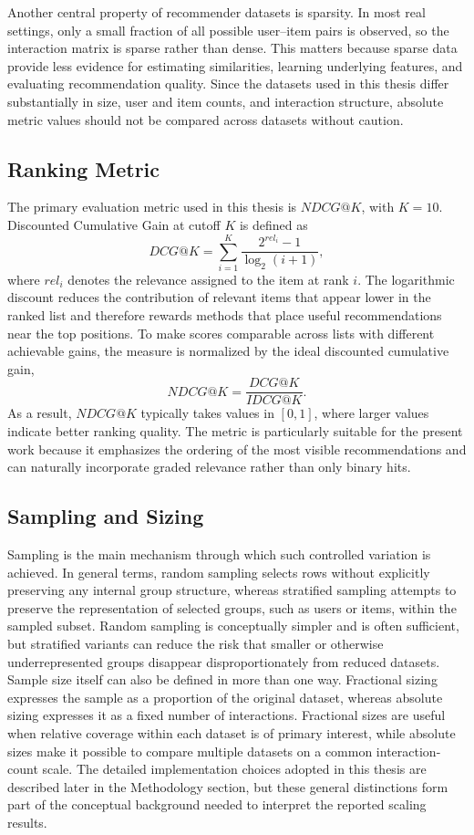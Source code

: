 \documentclass[12pt,a4paper]{article}
\begin{document}
Another central property of recommender datasets is sparsity. In most real settings, only a small fraction of all possible user--item pairs is observed, so the interaction matrix is sparse rather than dense. This matters because sparse data provide less evidence for estimating similarities, learning underlying features, and evaluating recommendation quality. Since the datasets used in this thesis differ substantially in size, user and item counts, and interaction structure, absolute metric values should not be compared across datasets without caution.

\subsection{Ranking Metric}

The primary evaluation metric used in this thesis is $NDCG@K$, with $K=10$. Discounted Cumulative Gain at cutoff $K$ is defined as
\[
DCG@K = \sum_{i=1}^{K} \frac{2^{rel_i}-1}{\log_2(i+1)},
\]
where $rel_i$ denotes the relevance assigned to the item at rank $i$. The logarithmic discount reduces the contribution of relevant items that appear lower in the ranked list and therefore rewards methods that place useful recommendations near the top positions. To make scores comparable across lists with different achievable gains, the measure is normalized by the ideal discounted cumulative gain,
\[
NDCG@K = \frac{DCG@K}{IDCG@K}.
\]
As a result, $NDCG@K$ typically takes values in $[0,1]$, where larger values indicate better ranking quality. The metric is particularly suitable for the present work because it emphasizes the ordering of the most visible recommendations and can naturally incorporate graded relevance rather than only binary hits.

\subsection{Sampling and Sizing}

Sampling is the main mechanism through which such controlled variation is achieved. In general terms, random sampling selects rows without explicitly preserving any internal group structure, whereas stratified sampling attempts to preserve the representation of selected groups, such as users or items, within the sampled subset. Random sampling is conceptually simpler and is often sufficient, but stratified variants can reduce the risk that smaller or otherwise underrepresented groups disappear disproportionately from reduced datasets. Sample size itself can also be defined in more than one way. Fractional sizing expresses the sample as a proportion of the original dataset, whereas absolute sizing expresses it as a fixed number of interactions. Fractional sizes are useful when relative coverage within each dataset is of primary interest, while absolute sizes make it possible to compare multiple datasets on a common interaction-count scale. The detailed implementation choices adopted in this thesis are described later in the Methodology section, but these general distinctions form part of the conceptual background needed to interpret the reported scaling results.
\end{document}
